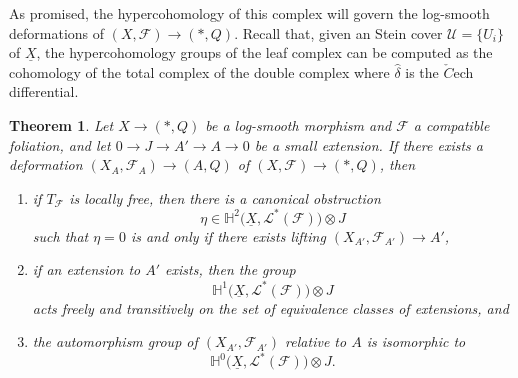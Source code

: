 \documentclass[reqno]{amsart}
\renewcommand\H{\mathbb{H}}
\newcommand{\F}{\mathscr{F}}
\newcommand{\U}{\mathcal{U}}
\renewcommand{\H}{\mathbb{H}}
\newcounter{Theorem}
\newtheorem{theorem}{Theorem}[section]
\theoremstyle{definition}
\theoremstyle{named}
\begin{document}
As promised, the hypercohomology of this complex will govern the log-smooth deformations of $(X,\F)\to (\ast,Q)$. Recall that, given an Stein cover $\U = \{U_i\}$ of $\underline{X}$, the hypercohomology groups of the leaf complex can be computed as the cohomology of the total complex of the double complex \smash{$\big(C^\bullet(\U, \mathcal L^\bullet(\F)), \delta, \hat\delta\big)$} where $\hat\delta$ is the $\check{C}$ech differential.


\begin{theorem} \label{teo:defobst}
Let $X\to(\ast,Q)$ be a log-smooth morphism and $\F$ a compatible foliation, and let $0\to J\to A'\to A\to 0$ be a small extension. If there exists a deformation $(X_A,\F_A)\to (A,Q)$ of $(X,\F)\to(\ast,Q)$, then 
\begin{enumerate}
    \item if $T_\F$ is locally free, then there is a canonical obstruction $$\eta\in \H^2\big(\underline{X},\mathcal L^\ast(\F)\big)\otimes J$$ such that $\eta=0$ is and only if there exists lifting $(X_{A'},\F_{A'})\to A'$,
    \item if an extension to $A'$ exists, then the group $$\H^1\big(\underline{X},\mathcal L^\ast(\F)\big)\otimes J$$ acts freely and transitively on the set of equivalence classes of extensions, and
    \item the automorphism group of $(X_{A'},\F_{A'})$ relative to $A$ is isomorphic to $$\H^0\big(\underline{X},\mathcal L^\ast(\F)\big)\otimes J.$$
\end{enumerate}
\end{theorem}
\end{document}
